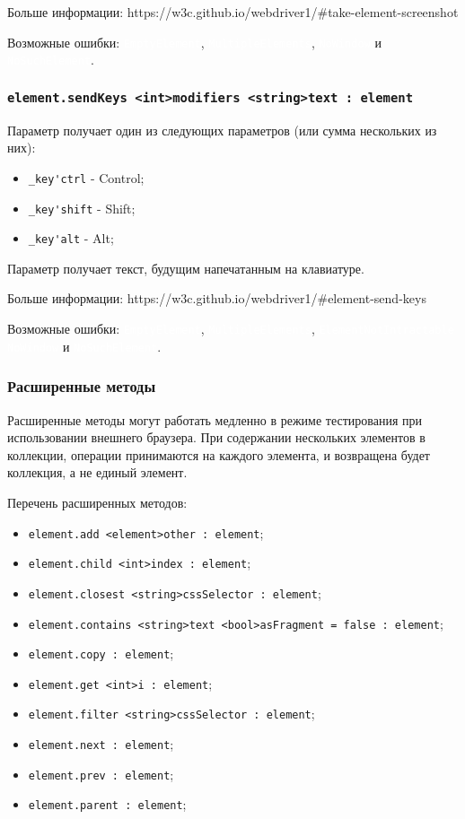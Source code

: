 \documentclass[a4paper, 14pt]{extarticle}
\newcommand{\ferror}[1]{{\fontsize{11pt}{12pt} \tt \colorbox{function}{\textcolor{white}{#1}}}}
\newenvironment{icItems}
	{ \begin{itemize} [noitemsep,nolistsep] }
	{ \end{itemize} }
\begin{document}
Больше информации: https://w3c.github.io/webdriver1/\#take-element-screenshot

Возможные ошибки: \ferror{EmptyElement}, \ferror{MultipleElements}, \ferror{NoWindow} и \ferror{NoSuchElement}.

\subsubsection{\lstinline|element.sendKeys <int>modifiers <string>text : element|}

Параметр  получает один из следующих параметров (или сумма нескольких из них):
\begin{icItems}
	\item \lstinline|_key'ctrl| - Control;
	\item \lstinline|_key'shift| - Shift;
	\item \lstinline|_key'alt| - Alt;
\end{icItems}

Параметр  получает текст, будущим напечатанным на клавиатуре.

Больше информации: https://w3c.github.io/webdriver1/\#element-send-keys

Возможные ошибки: \ferror{EmptyElement}, \ferror{MultipleElements}, \ferror{ElementNotIntractable} \ferror{NoWindow} и \ferror{NoSuchElement}.

\subsubsection{Расширенные методы}

Расширенные методы могут работать медленно в режиме тестирования при использовании внешнего браузера. При содержании нескольких элементов в коллекции, операции принимаются на каждого элемента, и возвращена будет коллекция, а не единый элемент.

Перечень расширенных методов:
\begin{icItems}
	\item \lstinline|element.add <element>other : element|;
	\item \lstinline|element.child <int>index : element|;
	\item \lstinline|element.closest <string>cssSelector : element|;
	\item \lstinline|element.contains <string>text <bool>asFragment = false : element|;
	\item \lstinline|element.copy : element|;
	\item \lstinline|element.get <int>i : element|;
	\item \lstinline|element.filter <string>cssSelector : element|;
	\item \lstinline|element.next : element|;
	\item \lstinline|element.prev : element|;
	\item \lstinline|element.parent : element|;
\end{icItems}
\end{document}
